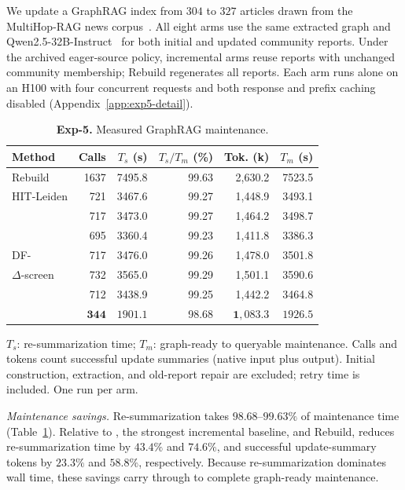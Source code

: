 We update a GraphRAG index from $304$ to $327$ articles drawn from the
MultiHop-RAG news corpus~\cite{tang2024multihoprag}. All eight arms use
the same extracted graph and Qwen2.5-32B-Instruct~\cite{yang2024qwen25}
for both initial and updated community reports.
Under the archived eager-source policy, incremental arms reuse reports with
unchanged community membership; Rebuild regenerates all reports. Each arm
runs alone on an H100 with four concurrent requests and both response and
prefix caching disabled (Appendix~\ref{app:exp5-detail}).

\begin{table}[tb]\centering
\caption{\textbf{Exp-5.} Measured GraphRAG maintenance.}
\label{tab:arena-main}
\footnotesize
\setlength{\tabcolsep}{0.25em}
\begin{tabular*}{\linewidth}{@{\extracolsep{\fill}}lrrrrr@{}}
\toprule
Method & Calls & $T_s$ (s) & $T_s/T_m$ (\%) & Tok. (k) & $T_m$ (s) \\
\midrule
Rebuild & 1637 & 7495.8 & 99.63 & 2,630.2 & 7523.5 \\
HIT-Leiden & 721 & 3467.6 & 99.27 & 1,448.9 & 3493.1 \\
\DynaMo{} & 717 & 3473.0 & 99.27 & 1,464.2 & 3498.7 \\
\QCA{} & 695 & 3360.4 & 99.23 & 1,411.8 & 3386.3 \\
DF-\Louvain{} & 717 & 3476.0 & 99.26 & 1,478.0 & 3501.8 \\
$\Delta$-screen & 732 & 3565.0 & 99.29 & 1,501.1 & 3590.6 \\
\Batch{} & 712 & 3438.9 & 99.25 & 1,442.2 & 3464.8 \\
\DyLo{} & $\mathbf{344}$ & $\mathbf{1901.1}$ & 98.68 & $\mathbf{1,083.3}$ & $\mathbf{1926.5}$ \\
\bottomrule
\end{tabular*}
\par\smallskip\raggedright
$T_s$: re-summarization time; $T_m$: graph-ready to queryable maintenance.
Calls and tokens count successful update summaries (native input plus output).
Initial construction, extraction, and old-report repair are excluded; retry
time is included. One run per arm.
\end{table}

\emph{Maintenance savings.} Re-summarization takes $98.68$--$99.63\%$ of
maintenance time (Table~\ref{tab:arena-main}). Relative to \QCA{}, the
strongest incremental baseline, and Rebuild, \DyLo{} reduces
re-summarization time by $43.4\%$ and $74.6\%$, and successful update-summary
tokens by $23.3\%$ and $58.8\%$, respectively. Because re-summarization
dominates wall time, these savings carry through to complete graph-ready
maintenance.

